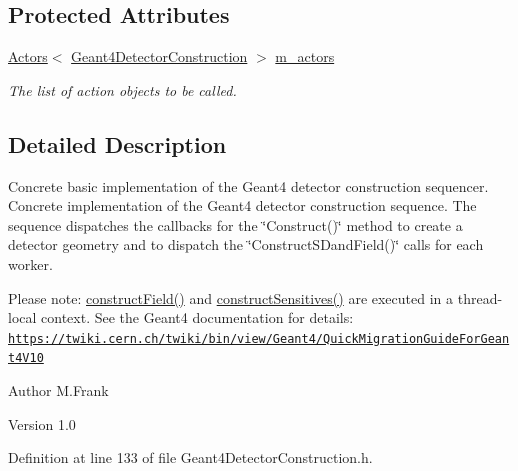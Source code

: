 \subsection*{Protected Attributes}
\begin{DoxyCompactItemize}
\item 
\hyperlink{class_d_d4hep_1_1_simulation_1_1_geant4_action_1_1_actors}{Actors}$<$ \hyperlink{class_d_d4hep_1_1_simulation_1_1_geant4_detector_construction}{Geant4DetectorConstruction} $>$ \hyperlink{class_d_d4hep_1_1_simulation_1_1_geant4_detector_construction_sequence_aa67150ae24c47c85655faf5bd89fad28}{m\_\-actors}
\begin{DoxyCompactList}\small\item\em The list of action objects to be called. \item\end{DoxyCompactList}\end{DoxyCompactItemize}


\subsection{Detailed Description}
Concrete basic implementation of the Geant4 detector construction sequencer. Concrete implementation of the Geant4 detector construction sequence. The sequence dispatches the callbacks for the \char`\"{}Construct()\char`\"{} method to create a detector geometry and to dispatch the \char`\"{}ConstructSDandField()\char`\"{} calls for each worker.

Please note: \hyperlink{class_d_d4hep_1_1_simulation_1_1_geant4_detector_construction_sequence_a74d488648a50cae0230ca9dedf678160}{constructField()} and \hyperlink{class_d_d4hep_1_1_simulation_1_1_geant4_detector_construction_sequence_ab242c91f95283ed32133f48f2bc573fa}{constructSensitives()} are executed in a thread-\/local context. See the Geant4 documentation for details: \href{https://twiki.cern.ch/twiki/bin/view/Geant4/QuickMigrationGuideForGeant4V10}{\tt https://twiki.cern.ch/twiki/bin/view/Geant4/QuickMigrationGuideForGeant4V10}

\begin{DoxyAuthor}{Author}
M.Frank 
\end{DoxyAuthor}
\begin{DoxyVersion}{Version}
1.0 
\end{DoxyVersion}


Definition at line 133 of file Geant4DetectorConstruction.h.

